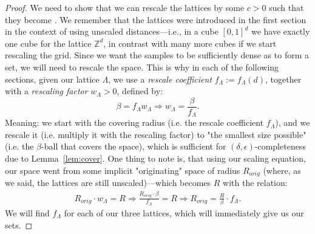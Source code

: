 \begin{proof}
     We need to show that we can rescale the lattices \Lattices by some $c>0$ such that they become \decomp. We remember that the lattices were introduced in the first section in the context of using unscaled distances---i.e., in a cube $[0,1]^d$ we have exactly one cube for the lattice $\mathbb{Z}^d$, in contrast with many more cubes if we start rescaling the grid. Since we want the samples to be sufficiently dense as to form a \decomp set, we will need to rescale the space. This is why in each of the following sections, given our lattice $\Lambda$, we use a \emph{rescale coefficient} $f_\Lambda:=f_\Lambda\left(d\right)$, together with a \emph{rescaling factor} $w_\Lambda>0$, defined by:
    \[
        \beta = f_\Lambda w_\Lambda\Rightarrow w_\Lambda = \frac{\beta}{f_\Lambda}.
    \]
    Meaning: we start with the covering radius (i.e. the rescale coefficient $f_\Lambda$), and we rescale it (i.e. multiply it with the rescaling factor) to "the smallest size possible" (i.e. the $\beta$-ball that covers the space), which is sufficient for $\left(\delta,\epsilon\right)$-completeness due to Lemma~\ref{lem:cover}.
    One thing to note is, that using our scaling equation, our space went from some implicit "originating" space of radius $R_{orig}$ (where, as we said, the lattices are still unscaled)---which becomes $R$ with the relation:
    \begin{align*}
        R_{orig}\cdot w_\Lambda = R \Rightarrow \frac{R_{orig}\cdot\beta}{f_\Lambda}=R\Rightarrow R_{orig}=\frac{R}{\beta}\cdot f_\Lambda.
    \end{align*}
    We will find $f_\Lambda$ for each of our three lattices, which will immediately give us our \decomp sets.



\end{proof}
